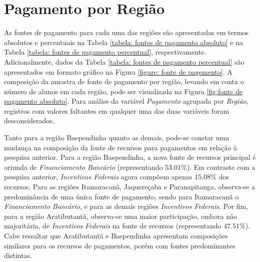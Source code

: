 \documentclass[10pt,a4paper,oneside]{article}
\newcommand{\arat}{Aratibutantã\xspace}
\newcommand{\baep}{Baependinha\xspace}
\newcommand{\itam}{Itamaracanã\xspace}
\newcommand{\jaqu}{Jaquereçaba\xspace}
\newcommand{\para}{Paranapitanga\xspace}
\begin{document}

\FloatBarrier
\section{Pagamento por Região}
\label{section:pagamento-regiao}

As fontes de pagamento para cada uma das regiões são apresentadas em termos absolutos e percentuais na Tabela \ref{tabela: fontes de pagamento absoluto} e na Tabela \ref{tabela: fontes de pagamento percentual}, respectivamente. Adicionalmente, dados da Tabela \ref{tabela: fontes de pagamento percentual} são apresentados em formato gráfico na Figura \ref{figure: fonte de pagemento}. A composição da amostra de fonte de pagamento por região, levando em conta o número de alunos em cada região, pode ser visualizada na Figura \ref{fig:fonte de pagamento absoluto}. Para análise da variável \textit{Pagamento} agrupada por \textit{Região}, registros com valores faltantes em qualquer uma das duas variáveis foram desconsiderados.

Tanto para a região \baep quanto as demais, pode-se constar uma mudança na composição da fonte de recursos para pagamentos em relação à pesquisa anterior. Para a região \baep, a nova fonte de recursos principal é oriunda de \textit{Financiamento Bancário} (representando $53.01\%$). Em contraste com a pesquisa anterior, \textit{Incentivos Federais} agora compõem apenas $15.08\%$ dos recursos. Para as regiões \itam, \jaqu e \para, observa-se a predominância de uma única fonte de pagamento, sendo para \itam o \textit{Financiamento Bancário}, e para as demais regiões \textit{Incentivos Federais}. Por fim, para a região \arat, observa-se uma maior participação, embora não majoritária, de \textit{Incentivos Federais} na fonte de recursos (representando $47.51\%$). Cabe ressaltar que \arat e \baep apresentam composições similares para os recursos de pagamentos, porém com fontes predominantes distintas.
\end{document}
